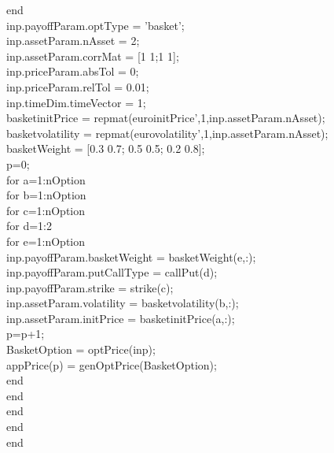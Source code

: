 \documentclass[]{elsarticle}
\theoremstyle{definition}
\theoremstyle{remark}
\begin{document}
              end\\
              inp.payoffParam.optType = {'basket'};\\
              inp.assetParam.nAsset = 2;\\
              inp.assetParam.corrMat = [1 1;1 1];\\
              inp.priceParam.absTol = 0;  \\
              inp.priceParam.relTol = 0.01;\\
              inp.timeDim.timeVector = 1;\\
              basketinitPrice = repmat(euroinitPrice',1,inp.assetParam.nAsset);\\
              basketvolatility = repmat(eurovolatility',1,inp.assetParam.nAsset);\\
              basketWeight = [0.3 0.7; 0.5 0.5; 0.2 0.8];\\
              p=0;\\
              for a=1:nOption\\
                  for b=1:nOption\\
                      for c=1:nOption\\
                          for d=1:2\\
                              for e=1:nOption\\
                                 inp.payoffParam.basketWeight = basketWeight(e,:);\\
                                 inp.payoffParam.putCallType = callPut(d);\\
                                 inp.payoffParam.strike = strike(c);\\
                                 inp.assetParam.volatility = basketvolatility(b,:);\\
                                 inp.assetParam.initPrice = basketinitPrice(a,:);\\
                                 p=p+1;\\
                                 BasketOption = optPrice(inp);\\
                                 appPrice(p) = genOptPrice(BasketOption);\\
                              end\\
                          end\\
                      end\\
                  end\\
              end\\
              
\end{document}
